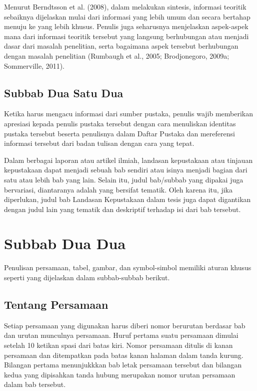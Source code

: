 Menurut Berndtsson et al. (2008), dalam melakukan sintesis, informasi teoritik sebaiknya dijelaskan mulai dari informasi yang lebih umum dan secara bertahap menuju ke yang lebih khusus. Penulis juga seharusnya menjelaskan aspek-aspek mana dari informasi teoritik tersebut yang langsung berhubungan atau menjadi dasar dari masalah penelitian, serta bagaimana aspek tersebut berhubungan dengan masalah penelitian (Rumbaugh et al., 2005; Brodjonegoro, 2009a; Sommerville, 2011).

\subsection{Subbab Dua Satu Dua}

Ketika harus mengacu informasi dari sumber pustaka, penulis wajib memberikan apresiasi kepada penulis pustaka tersebut dengan cara menuliskan identitas pustaka tersebut beserta penulisnya dalam Daftar Pustaka dan mereferensi informasi tersebut dari badan tulisan dengan cara yang tepat.

Dalam berbagai laporan atau artikel ilmiah, landasan kepustakaan atau tinjauan kepustakaan dapat menjadi sebuah bab sendiri atau isinya menjadi bagian dari satu atau lebih bab yang lain. Selain itu, judul bab/subbab yang dipakai juga bervariasi, diantaranya adalah yang bersifat tematik. Oleh karena itu, jika diperlukan, judul bab Landasan Kepustakaan dalam tesis juga dapat digantikan dengan judul lain yang tematik dan deskriptif terhadap isi dari bab tersebut.

\section{Subbab Dua Dua}

Penulisan persamaan, tabel, gambar, dan symbol-simbol memiliki aturan khusus seperti yang dijelaskan dalam subbab-subbab berikut.

\subsection{Tentang Persamaan}

Setiap   persamaan   yang   digunakan   harus   diberi   nomor   berurutan  berdasar bab dan urutan munculnya persamaan. Huruf pertama suatu persamaan dimulai setelah 10 ketikan spasi dari batas kiri. Nomor persamaan ditulis di kanan persamaan dan ditempatkan pada batas kanan halaman dalam tanda kurung. 
Bilangan pertama menunjukkkan bab letak persamaan tersebut dan bilangan kedua yang dipisahkan tanda hubung merupakan nomor urutan persamaan dalam bab tersebut. 

